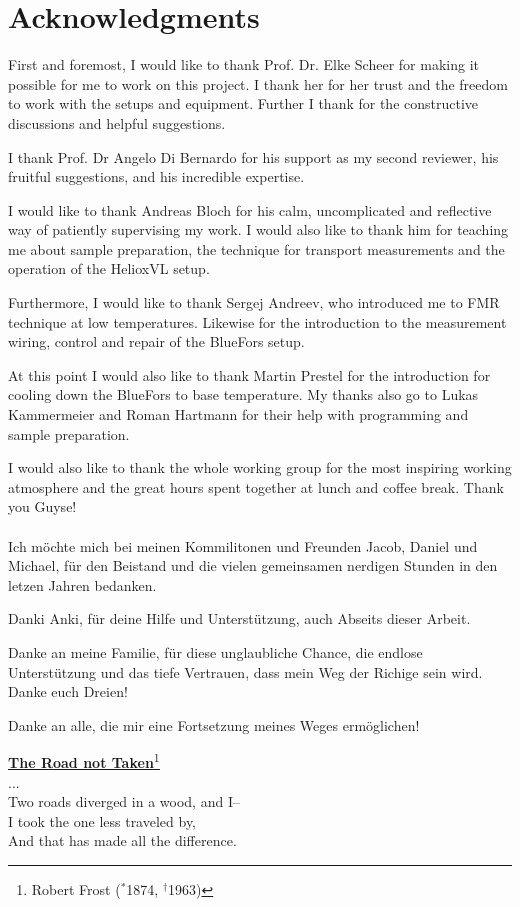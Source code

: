 \chapter*{Acknowledgments}
First and foremost, I would like to thank Prof. Dr. Elke Scheer for making it possible for me to work on this project. I thank her for her trust and the freedom to work with the setups and equipment. Further I thank for the constructive discussions and helpful suggestions.

I thank Prof. Dr Angelo Di Bernardo for his support as my second reviewer, his fruitful suggestions, and his incredible expertise.

I would like to thank Andreas Bloch for his calm, uncomplicated and reflective way of patiently supervising my work. I would also like to thank him for teaching me about sample preparation, the technique for transport measurements and the operation of the HelioxVL setup. 

Furthermore, I would like to thank Sergej Andreev, who introduced me to FMR technique at low temperatures. Likewise for the introduction to the measurement wiring, control and repair of the BlueFors setup.

At this point I would also like to thank Martin Prestel for the introduction for cooling down the BlueFors to base temperature. My thanks also go to Lukas Kammermeier and Roman Hartmann for their help with programming and sample preparation.

I would also like to thank the whole working group for the most inspiring working atmosphere and the great hours spent together at lunch and coffee break. Thank you Guyse!\\
\\
\indent Ich möchte mich bei meinen Kommilitonen und Freunden Jacob, Daniel und Michael, für den Beistand und die vielen gemeinsamen nerdigen Stunden in den letzen Jahren bedanken.

Danki Anki, für deine Hilfe und Unterstützung, auch Abseits dieser Arbeit.

Danke an meine Familie, für diese unglaubliche Chance, die endlose Unterstützung und das tiefe Vertrauen, dass mein Weg der Richige sein wird. Danke euch Dreien!

Danke an alle, die mir eine Fortsetzung meines Weges ermöglichen!

\setcounter{footnote}{0}
\vfill\begin{centering}
{\underline{\textbf{The Road not Taken}\footnote{Robert Frost ($^*$1874, $^\dagger$1963)}}}\vspace{0.8cm}\\
...\\
Two roads diverged in a wood, and I--\\
I took the one less traveled by,\\
And that has made all the difference.\\
\end{centering}\vfill